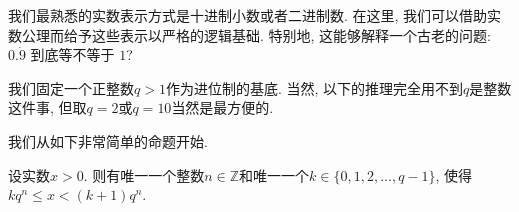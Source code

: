 

我们最熟悉的实数表示方式是十进制小数或者二进制数. 在这里, 我们可以借助实数公理而给予这些表示以严格的逻辑基础. 特别地, 这能够解释一个古老的问题: $0.\dot{9}$ 到底等不等于 $1$?

我们固定一个正整数$q>1$作为进位制的基底. 当然, 以下的推理完全用不到$q$是整数这件事, 但取$q=2$或$q=10$当然是最方便的.

我们从如下非常简单的命题开始. 
\begin{lemma}{}
设实数$x>0$. 则有唯一一个整数$n\in\mathbb{Z}$和唯一一个$k\in\{0,1,2,...,q-1\}$, 使得$kq^n\leq x<(k+1)q^{n}$.
\end{lemma}

